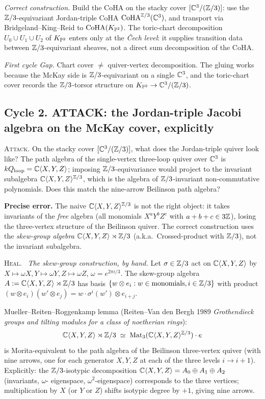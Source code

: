 \emph{Correct construction.} Build the CoHA on the stacky cover
$[\mathbb{C}^3/(\mathbb{Z}/3)]$: use the $\mathbb{Z}/3$-equivariant Jordan-triple CoHA
$\mathrm{CoHA}^{\mathbb{Z}/3}(\mathbb{C}^3)$, and transport via Bridgeland--King--Reid to
$\mathrm{CoHA}(K_{\mathbb{P}^2})$. The toric-chart decomposition $U_0\cup U_1\cup U_2$
of $K_{\mathbb{P}^2}$ enters only at the \emph{\v Cech level}: it supplies
transition data between $\mathbb{Z}/3$-equivariant sheaves, not a direct sum
decomposition of the CoHA.

\emph{First cycle Gap.} Chart cover $\ne$ quiver-vertex decomposition.
The gluing works because the McKay side is $\mathbb{Z}/3$-equivariant on a
single $\mathbb{C}^3$, and the toric-chart cover records the $\mathbb{Z}/3$-torsor
structure on $K_{\mathbb{P}^2}\to\mathbb{C}^3/(\mathbb{Z}/3)$.

\subsection*{Cycle 2. ATTACK: the Jordan-triple Jacobi algebra on the
McKay cover, explicitly}

\textsc{Attack.} On the stacky cover $[\mathbb{C}^3/(\mathbb{Z}/3)]$, what does the
Jordan-triple quiver look like? The path algebra of the single-vertex
three-loop quiver over $\mathbb{C}^3$ is $kQ_{\mathrm{loop}}=\mathbb{C}\langle X,Y,Z\rangle$;
imposing $\mathbb{Z}/3$-equivariance would project to the invariant subalgebra
$\mathbb{C}\langle X,Y,Z\rangle^{\mathbb{Z}/3}$, which is the algebra of
$\mathbb{Z}/3$-invariant non-commutative polynomials. Does this match the
nine-arrow Beilinson path algebra?

\textbf{Precise error.} The naive $\mathbb{C}\langle X,Y,Z\rangle^{\mathbb{Z}/3}$ is
not the right object: it takes invariants of the \emph{free} algebra
(all monomials $X^aY^bZ^c$ with $a+b+c\in 3\mathbb{Z}$), losing the three-vertex
structure of the Beilinson quiver. The correct construction uses the
\emph{skew-group algebra} $\mathbb{C}\langle X,Y,Z\rangle\rtimes\mathbb{Z}/3$
(a.k.a.\ Crossed-product with $\mathbb{Z}/3$), not the invariant subalgebra.

\textsc{Heal.} \ClaimStatusDerivation\ \emph{The skew-group construction,
by hand.} Let $\sigma\in\mathbb{Z}/3$ act on $\mathbb{C}\langle X,Y,Z\rangle$ by
$X\mapsto\omega X,Y\mapsto\omega Y,Z\mapsto\omega Z$,
$\omega=e^{2\pi i/3}$. The skew-group algebra
$A:=\mathbb{C}\langle X,Y,Z\rangle\rtimes\mathbb{Z}/3$ has basis
$\{w\otimes e_i:w\in\text{monomials},i\in\mathbb{Z}/3\}$ with product
$(w\otimes e_i)(w'\otimes e_j)=w\cdot\sigma^i(w')\otimes e_{i+j}$.

Mueller--Reiten--Roggenkamp lemma
(Reiten--Van den Bergh 1989 \emph{Grothendieck groups and tilting
modules for a class of noetherian rings}):
\[
\mathbb{C}\langle X,Y,Z\rangle\rtimes\mathbb{Z}/3\;\simeq\;\mathrm{Mat}_3(\mathbb{C}\langle
X,Y,Z\rangle^{\mathbb{Z}/3})\cdot e
\]
is Morita-equivalent to the path algebra of the Beilinson three-vertex
quiver (with nine arrows, one for each generator $X,Y,Z$ at each of the
three levels $i\to i+1$). Explicitly: the $\mathbb{Z}/3$-isotypic decomposition
$\mathbb{C}\langle X,Y,Z\rangle=A_0\oplus A_1\oplus A_2$ (invariants, $\omega$-
eigenspace, $\omega^2$-eigenspace) corresponds to the three vertices;
multiplication by $X$ (or $Y$ or $Z$) shifts isotypic degree by $+1$,
giving nine arrows.

